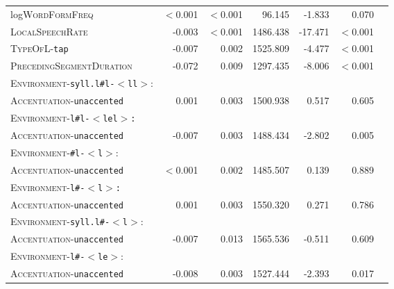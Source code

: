 \begin{table}
{\begin{tabular} {lrrrrrr}
		log\textsc{WordFormFreq }& \color[HTML]{9B9B9B} $<$0.001 & \color[HTML]{9B9B9B} $<$0.001 & \color[HTML]{9B9B9B} 96.145 & \color[HTML]{9B9B9B} -1.833 & \color[HTML]{9B9B9B} 0.070 \\ 
		
		\textsc{LocalSpeechRate} & -0.003 &$<$0.001  & 1486.438 & -17.471 &$<$0.001 \\ 
		
		
		\textsc{TypeOfL}-\texttt{tap} & -0.007 & 0.002 & 1525.809 & -4.477 & $<$0.001 \\ 
		
		\textsc{PrecedingSegmentDuration} & -0.072 & 0.009 & 1297.435 & -8.006 & $<$0.001 \\ 
		
		\textsc{Environment}-\texttt{syll.l\#l-$<$ll$>$}:&&&&&\\
		\textsc{Accentuation}-\texttt{unaccented} & \color[HTML]{9B9B9B} 0.001 & \color[HTML]{9B9B9B} 0.003 & \color[HTML]{9B9B9B} 1500.938 &\color[HTML]{9B9B9B}  0.517 & \color[HTML]{9B9B9B} 0.605 \\ 
		
		\textsc{Environment}-\texttt{l\#l-$<$lel$>$:}&&&&&\\
		\textsc{Accentuation}-\texttt{unaccented} & -0.007 & 0.003 & 1488.434 & -2.802 & 0.005 \\
		
		\textsc{Environment}-\texttt{\#l-$<$l$>$}:&&&&&\\
		\textsc{Accentuation}-\texttt{unaccented} & \color[HTML]{9B9B9B} $<$0.001  & \color[HTML]{9B9B9B} 0.002 & \color[HTML]{9B9B9B} 1485.507 & \color[HTML]{9B9B9B} 0.139 & \color[HTML]{9B9B9B} 0.889 \\ 
		
		\textsc{Environment}-\texttt{l\#-$<$l$>$:}&&&&&\\
		\textsc{Accentuation}-\texttt{unaccented} & \color[HTML]{9B9B9B} 0.001 & \color[HTML]{9B9B9B} 0.003 & \color[HTML]{9B9B9B} 1550.320 &  \color[HTML]{9B9B9B} 0.271 &\color[HTML]{9B9B9B}  0.786 \\ 
		
		\textsc{Environment}-\texttt{syll.l\#-$<$l$>$}:&&&&&\\
		\textsc{Accentuation}-\texttt{unaccented} &\color[HTML]{9B9B9B}  -0.007 &\color[HTML]{9B9B9B}  0.013 & \color[HTML]{9B9B9B} 1565.536 &\color[HTML]{9B9B9B}  -0.511 &\color[HTML]{9B9B9B}  0.609 \\ 
		
		\textsc{Environment}-\texttt{l\#-$<$le$>$}:&&&&&\\
		\textsc{Accentuation}-\texttt{unaccented} & -0.008 & 0.003 & 1527.444 & -2.393 & 0.017 \\ 
		

\end{tabular}}
\end{table}
